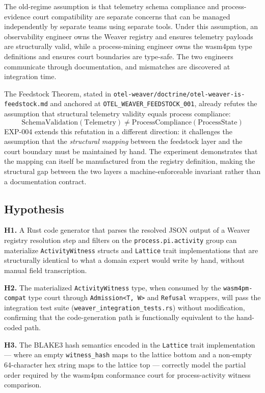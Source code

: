 The old-regime assumption is that telemetry schema compliance and process-evidence court
compatibility are separate concerns that can be managed independently by separate teams
using separate tools. Under this assumption, an observability engineer owns the Weaver
registry and ensures telemetry payloads are structurally valid, while a process-mining
engineer owns the wasm4pm type definitions and ensures court boundaries are type-safe.
The two engineers communicate through documentation, and mismatches are discovered at
integration time.

The Feedstock Theorem, stated in
\texttt{otel-weaver/doctrine/otel-weaver-is-feedstock.md} and anchored at
\texttt{OTEL\_WEAVER\_FEEDSTOCK\_001}, already refutes the assumption that structural
telemetry validity equals process compliance:
\[
\text{SchemaValidation}(\text{Telemetry}) \neq \text{ProcessCompliance}(\text{ProcessState})
\]
EXP-004 extends this refutation in a different direction: it challenges the assumption that
the \emph{structural mapping} between the feedstock layer and the court boundary must be
maintained by hand. The experiment demonstrates that the mapping can itself be
manufactured from the registry definition, making the structural gap between the two layers
a machine-enforceable invariant rather than a documentation contract.

\subsection{Hypothesis}
\label{sec:otel-weaver-exp-004-registry-to-witness-hypothesis}

\textbf{H1.} A Rust code generator that parses the resolved JSON output of a Weaver
registry resolution step and filters on the \texttt{process.pi.activity} group can
materialize \texttt{ActivityWitness} structs and \texttt{Lattice} trait implementations
that are structurally identical to what a domain expert would write by hand, without
manual field transcription.

\textbf{H2.} The materialized \texttt{ActivityWitness} type, when consumed by the
\texttt{wasm4pm-compat} type court through \texttt{Admission<T,\,W>} and \texttt{Refusal}
wrappers, will pass the integration test suite (\texttt{weaver\_integration\_tests.rs})
without modification, confirming that the code-generation path is functionally equivalent
to the hand-coded path.

\textbf{H3.} The BLAKE3 hash semantics encoded in the \texttt{Lattice} trait implementation
--- where an empty \texttt{witness\_hash} maps to the lattice bottom and a non-empty
64-character hex string maps to the lattice top --- correctly model the partial order
required by the wasm4pm conformance court for process-activity witness comparison.

